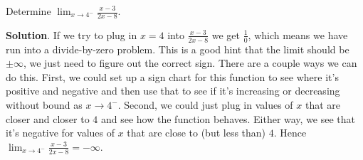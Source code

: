 \documentclass[10pt,]{book}
\theoremstyle{ptxplainnotitle}
\theoremstyle{ptxplaintitle}
\theoremstyle{ptxplainnotitle}
\theoremstyle{ptxplaintitle}
\theoremstyle{ptxplainnotitle}
\theoremstyle{ptxplaintitle}
\theoremstyle{ptxdefinitionnotitle}
\theoremstyle{ptxdefinitiontitle}
\theoremstyle{ptxdefinitionnotitle}
\theoremstyle{ptxdefinitiontitle}
\theoremstyle{ptxdefinitionnotitle}
\theoremstyle{ptxdefinitiontitle}
\theoremstyle{ptxdefinitionnotitle}
\theoremstyle{ptxdefinitiontitle}
\theoremstyle{ptxdefinitionnotitle}
\theoremstyle{ptxdefinitiontitle}
\numberwithin{equation}{section}
\begin{document}
\begin{example}\label{example-infinite-limit-involving-a-rational-function}
\hypertarget{p-57}{}%
Determine \(\lim_{x\to4^{-}}\frac{x-3}{2x-8}\).%
\par\smallskip%
\noindent\textbf{Solution}.\hypertarget{solution-11}{}\quad%
\hypertarget{p-58}{}%
If we try to plug in \(x=4\) into \(\frac{x-3}{2x-8}\) we get \(\frac{1}{0}\), which means we have run into a divide-by-zero problem. This is a good hint that the limit should be \(\pm\infty\), we just need to figure out the correct sign. There are a couple ways we can do this. First, we could set up a sign chart for this function to see where it's positive and negative and then use that to see if it's increasing or decreasing without bound as \(x\to4^{-}\). Second, we could just plug in values of \(x\) that are closer and closer to \(4\) and see how the function behaves. Either way, we see that it's negative for values of \(x\) that are close to (but less than) \(4\). Hence \(\lim_{x\to4^{-}}\frac{x-3}{2x-8}=-\infty\).%
\end{example}
\typeout{************************************************}
\typeout{************************************************}
\end{document}
